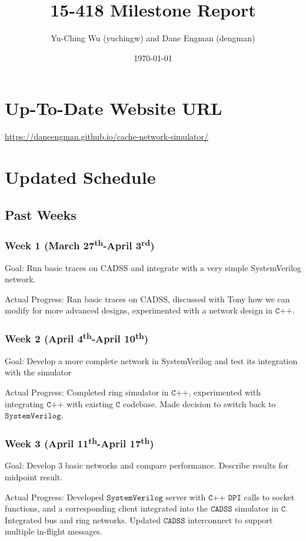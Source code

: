 \documentclass{article}
\title{15-418 Milestone Report}
\author{Yu-Ching Wu (yuchingw) and Dane Engman (dengman)}
\date{\today}
\begin{document}
\maketitle

\section{Up-To-Date Website URL}
\url{https://daneengman.github.io/cache-network-simulator/}

\section{Updated Schedule}
\subsection{Past Weeks}
    \subsubsection*{Week 1 (March 27\textsuperscript{th}-April 3\textsuperscript{rd})}
    Goal: Run basic traces on CADSS and integrate with a very simple SystemVerilog network.

    Actual Progress: Ran basic traces on CADSS, discussed with Tony how we can modify for more advanced designs, experimented with a network design in $\texttt{C++}$.
    
    \subsubsection*{Week 2 (April 4\textsuperscript{th}-April 10\textsuperscript{th})} Goal: Develop a more complete network in SystemVerilog and test its integration with the simulator
    
     Actual Progress: Completed ring simulator in $\texttt{C++}$, experimented with integrating $\texttt{C++}$ with existing $\texttt{C}$ codebase. Made decision to switch back to $\texttt{SystemVerilog}$. 
    
    \subsubsection*{Week 3 (April 11\textsuperscript{th}-April 17\textsuperscript{th})} Goal: Develop 3 basic networks and compare performance. Describe results for midpoint result.

    Actual Progress: Developed $\texttt{SystemVerilog}$ server with $\texttt{C++ DPI}$ calls to socket functions, and a corresponding client integrated into the $\texttt{CADSS}$ simulator in $\texttt{C}$. Integrated bus and ring networks. Updated $\texttt{CADSS}$ interconnect to support multiple in-flight messages. 
\end{document}
